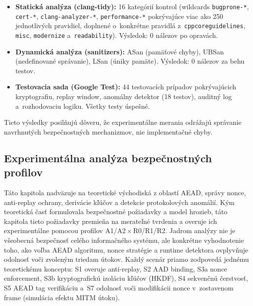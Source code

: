 \begin{itemize}[leftmargin=*,itemsep=2pt]
  \item \textbf{Statická analýza (clang-tidy\cite{ClangTidy}):} 16 kategórií kontrol (wildcards \texttt{bugprone-*}, \texttt{cert-*}, \texttt{clang-analyzer-*}, \texttt{performance-*} pokrývajúce viac ako 250 jednotlivých pravidiel, doplnené o~konkrétne pravidlá z~\texttt{cppcoreguidelines}, \texttt{misc}, \texttt{modernize} a~\texttt{readability}). Výsledok: 0 nálezov po opravách.
  \item \textbf{Dynamická analýza (sanitizers\cite{AddressSanitizer}):} ASan (pamäťové chyby), UBSan (nedefinované správanie), LSan (úniky pamäte). Výsledok: 0 nálezov za behu testov.
  \item \textbf{Testovacia sada (Google Test\cite{GoogleTest}):} 44 testovacích prípadov pokrývajúcich kryptografiu, replay window, anomálny detektor (18 testov), auditný log a~rozhodovaciu logiku. Všetky testy úspešné.
\end{itemize}

Tieto výsledky posilňujú dôveru, že experimentálne merania odrážajú správanie navrhnutých bezpečnostných mechanizmov, nie implementačné chyby.



\subsection{Experimentálna analýza bezpečnostných profilov}
\label{sec:experiments}

Táto kapitola nadväzuje na teoretické východiská z oblastí AEAD, správy nonce, anti-replay ochrany, derivácie kľúčov a detekcie protokolových anomálií. Kým teoretická časť formulovala bezpečnostné požiadavky a model hrozieb, táto kapitola tieto požiadavky premieňa na merateľné tvrdenia a overuje ich experimentálne pomocou profilov A1/A2\,$\times$\,R0/R1/R2. Jadrom analýzy nie je všeobecná bezpečnosť celého informačného systému, ale konkrétne vyhodnotenie toho, ako voľba AEAD algoritmu, nonce stratégie a runtime detektora ovplyvňuje odolnosť voči zvoleným triedam útokov. Každý scenár priamo zodpovedá jednému teoretickému konceptu: S1 overuje anti-replay, S2 AAD binding, S3a nonce enforcement, S3b kryptografickú izoláciu kľúčov (HKDF), S4 sekvenčnú čerstvosť, S5 AEAD tag verifikáciu a~S7 odolnosť voči modifikácii nonce v~zostavenom frame (simulácia efektu MITM útoku).

